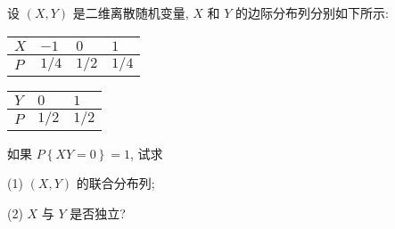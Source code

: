    \begin{example}
   	设 $(X,Y)$ 是二维离散随机变量, $X$ 和 $Y$ 的边际分布列分别如下所示:
   	\begin{table}[h]
   		\centering
   		\begin{tabularx}{0.4\textwidth}{Z|ZZZ}
   			\hline
   			$X$ & $-1$ & $0$ & $1$\\
   			\hline
   			$P$ & $1/4$ & $1/2$ & $1/4$\\
   			\hline
   		\end{tabularx}
   	    \qquad
   	    \begin{tabularx}{0.4\textwidth}{Z|ZZ}
   	    	\hline
   	    	$Y$ & $0$ & $1$\\
   	    	\hline
   	    	$P$ & $1/2$ & $1/2$\\
   	    	\hline
   	    \end{tabularx}
   	\end{table}
   如果 $P\left\{XY=0\right\}=1$, 试求

   (1) $(X,Y)$ 的联合分布列;

   (2) $X$ 与 $Y$ 是否独立?

   \end{example}
